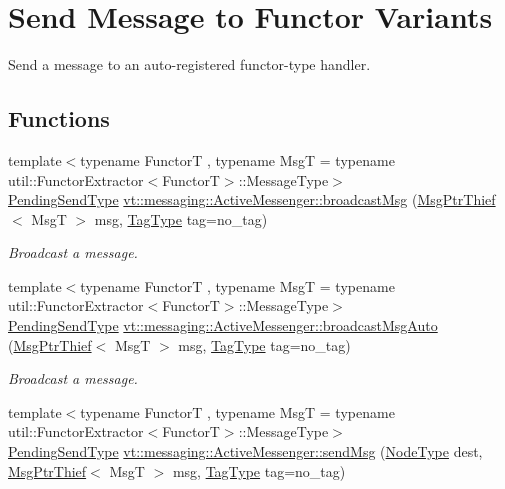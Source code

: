 \hypertarget{group__functorsend}{}\section{Send Message to Functor Variants}
\label{group__functorsend}


Send a message to an auto-\/registered functor-\/type handler.  


\subsection*{Functions}
\begin{DoxyCompactItemize}
\item 
{\footnotesize template$<$typename FunctorT , typename MsgT  = typename util\+::\+Functor\+Extractor$<$\+Functor\+T$>$\+::\+Message\+Type$>$ }\\\hyperlink{structvt_1_1messaging_1_1_active_messenger_a3626a6ca76d8ad4ec7c3b47a2c70d3a8}{Pending\+Send\+Type} \hyperlink{group__functorsend_ga06f3b2d69156852600ead958ae95e3c9}{vt\+::messaging\+::\+Active\+Messenger\+::broadcast\+Msg} (\hyperlink{structvt_1_1messaging_1_1_msg_ptr_thief}{Msg\+Ptr\+Thief}$<$ MsgT $>$ msg, \hyperlink{namespacevt_a84ab281dae04a52a4b243d6bf62d0e52}{Tag\+Type} tag=no\+\_\+tag)
\begin{DoxyCompactList}\small\item\em Broadcast a message. \end{DoxyCompactList}\item 
{\footnotesize template$<$typename FunctorT , typename MsgT  = typename util\+::\+Functor\+Extractor$<$\+Functor\+T$>$\+::\+Message\+Type$>$ }\\\hyperlink{structvt_1_1messaging_1_1_active_messenger_a3626a6ca76d8ad4ec7c3b47a2c70d3a8}{Pending\+Send\+Type} \hyperlink{group__functorsend_ga9337b80d48503a52676f80f86bc66cf2}{vt\+::messaging\+::\+Active\+Messenger\+::broadcast\+Msg\+Auto} (\hyperlink{structvt_1_1messaging_1_1_msg_ptr_thief}{Msg\+Ptr\+Thief}$<$ MsgT $>$ msg, \hyperlink{namespacevt_a84ab281dae04a52a4b243d6bf62d0e52}{Tag\+Type} tag=no\+\_\+tag)
\begin{DoxyCompactList}\small\item\em Broadcast a message. \end{DoxyCompactList}\item 
{\footnotesize template$<$typename FunctorT , typename MsgT  = typename util\+::\+Functor\+Extractor$<$\+Functor\+T$>$\+::\+Message\+Type$>$ }\\\hyperlink{structvt_1_1messaging_1_1_active_messenger_a3626a6ca76d8ad4ec7c3b47a2c70d3a8}{Pending\+Send\+Type} \hyperlink{group__functorsend_gaab0dc380a72f038f4fc2350ba89de98f}{vt\+::messaging\+::\+Active\+Messenger\+::send\+Msg} (\hyperlink{namespacevt_a866da9d0efc19c0a1ce79e9e492f47e2}{Node\+Type} dest, \hyperlink{structvt_1_1messaging_1_1_msg_ptr_thief}{Msg\+Ptr\+Thief}$<$ MsgT $>$ msg, \hyperlink{namespacevt_a84ab281dae04a52a4b243d6bf62d0e52}{Tag\+Type} tag=no\+\_\+tag)

\end{DoxyCompactItemize}
